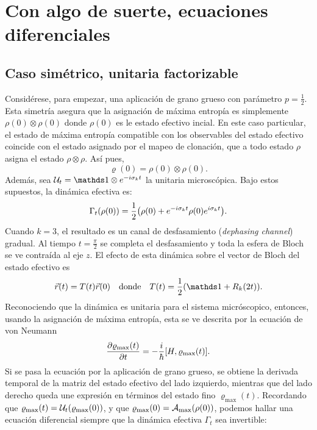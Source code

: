 \chapter{Con algo de suerte, ecuaciones diferenciales}
\section{Caso simétrico, unitaria factorizable}
Considérese, para empezar, una aplicación de grano grueso con parámetro $p=\frac{1}{2}$. Esta simetría asegura que la asignación de máxima entropía es simplemente $\rho(0)\otimes\rho(0)$ donde $\rho(0)$ es le estado efectivo incial. En este caso particular, el estado de máxima entropía compatible con los observables del estado efectivo coincide con el estado asignado por el mapeo de clonación, que a todo estado $\rho$ asigna el estado $\rho\otimes\rho$. Así pues,
\begin{equation*}
    \varrho(0)=\rho(0)\otimes\rho(0).
\end{equation*}
Además, sea $\mcU_{t}=\Id\otimes e^{-i\pauli{k}t}$ la unitaria microscópica. Bajo estos supuestos, la dinámica efectiva es:
\begin{equation*}
    \Gamma_{t}(\rho(0))=\frac{1}{2}\qty(\rho(0)+e^{-i\sigma_{k}t}\rho(0)e^{i\sigma_{k}t}).
\end{equation*}
Cuando $k=3$, el resultado es un canal de desfasamiento (\textit{dephasing channel}) gradual. Al tiempo $t=\frac{\pi}{2}$ se completa el desfasamiento y toda la esfera de Bloch se ve contraída al eje $z$. El efecto de esta dinámica sobre el vector de Bloch del estado efectivo es
\begin{align*}
    \vec{r}(t)=T(t)\vec{r}(0) & & \text{donde} & & T(t)=\frac{1}{2}(\Id+R_{k}(2t)).
\end{align*}
Reconociendo que la dinámica es unitaria para el sistema micróscopico, entonces, usando la asignación de máxima entropía, esta se ve descrita por la ecuación de von Neumann
\begin{equation*}
    \frac{\partial \varrho_{\max}(t)}{\partial t}=-\frac{i}{\hbar}\qty[H,\varrho_{\max}(t)].
\end{equation*}
Si se pasa la ecuación por la aplicación de grano grueso, se obtiene la derivada temporal de la matriz del estado efectivo del lado izquierdo, mientras que del lado derecho queda une expresión en términos del estado fino $\varrho_{\max}(t)$. Recordando que $\varrho_{\max}(t)=\mathcal{U}_{t}(\varrho_{\max}(0))$, y que $\varrho_{\max}(0)=\mathcal{A}_{\max}(\rho(0))$, podemos hallar una ecuación diferencial siempre que la dinámica efectiva $\Gamma_{t}$ sea invertible:
